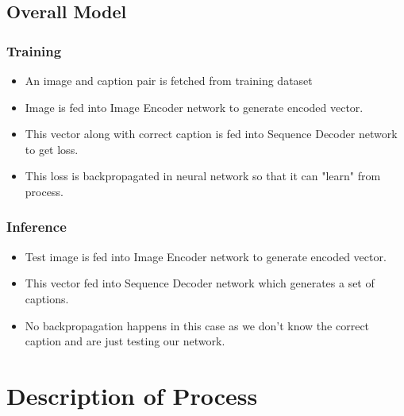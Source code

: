 \documentclass[11pt]{article}
\begin{document}
		\subsection{Overall Model}
			\subsubsection{Training}
				\begin{itemize}
				\item An image and caption pair is fetched from training dataset
				\item Image is fed into Image Encoder network to generate encoded vector.
				\item This vector along with correct caption is fed into Sequence Decoder network to get loss.
				\item This loss is backpropagated in neural network so that it can "learn" from process.
				\end{itemize}
			\subsubsection{Inference}
				\begin{itemize}
				\item Test image is fed into Image Encoder network to generate encoded vector.
				\item This vector fed into Sequence Decoder network which generates a set of captions.
				\item No backpropagation happens in this case as we don't know the correct caption and are just testing our network.
				\end{itemize}	
	
	\section{Description of Process}
	
\end{document}
